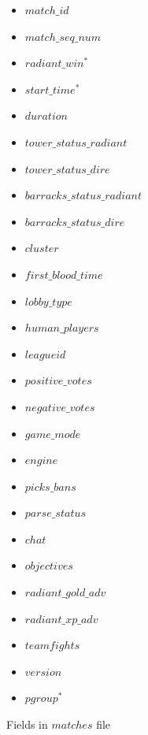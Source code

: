 \begin{figure}[h]
  \centering
    \caption{Fields in $matches$ file}
    \label{fig:matchesFile}
    \begin{mdframed}[linewidth=2pt]
        \begin{multicols}{2}
            \begin{itemize}
                \item $match\_id$
                \item $match\_seq\_num$
                \item $radiant\_win ^{*}$
                \item $start\_time ^{*}$
                \item $duration$
                \item $tower\_status\_radiant$
                \item $tower\_status\_dire$
                \item $barracks\_status\_radiant$
                \item $barracks\_status\_dire$
                \item $cluster$
                \item $first\_blood\_time$
                \item $lobby\_type$
                \item $human\_players$
                \item $leagueid$
                \item $positive\_votes$
                \item $negative\_votes$
                \item $game\_mode$
                \item $engine$
                \item $picks\_bans$
                \item $parse\_status$
                \item $chat$
                \item $objectives$
                \item $radiant\_gold\_adv$
                \item $radiant\_xp\_adv$
                \item $teamfights$
                \item $version$
                \item $pgroup ^{*}$
            \end{itemize}
        \end{multicols}
    \end{mdframed}
\end{figure}

